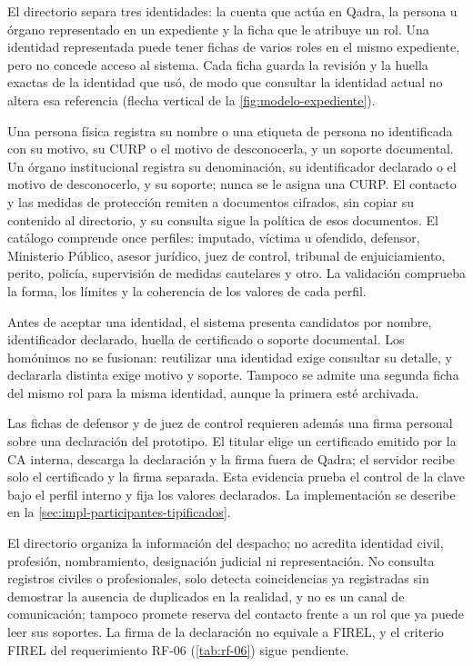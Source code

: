 El directorio separa tres identidades: la cuenta que actúa en Qadra, la persona u órgano representado en un expediente y la ficha que le atribuye un rol. Una identidad representada puede tener fichas de varios roles en el mismo expediente, pero no concede acceso al sistema. Cada ficha guarda la revisión y la huella exactas de la identidad que usó, de modo que consultar la identidad actual no altera esa referencia (flecha vertical de la \cref{fig:modelo-expediente}).

Una persona física registra su nombre o una etiqueta de persona no identificada con su motivo, su CURP o el motivo de desconocerla, y un soporte documental. Un órgano institucional registra su denominación, su identificador declarado o el motivo de desconocerlo, y su soporte; nunca se le asigna una CURP. El contacto y las medidas de protección remiten a documentos cifrados, sin copiar su contenido al directorio, y su consulta sigue la política de esos documentos. El catálogo comprende once perfiles: imputado, víctima u ofendido, defensor, Ministerio Público, asesor jurídico, juez de control, tribunal de enjuiciamiento, perito, policía, supervisión de medidas cautelares y otro. La validación comprueba la forma, los límites y la coherencia de los valores de cada perfil.

Antes de aceptar una identidad, el sistema presenta candidatos por nombre, identificador declarado, huella de certificado o soporte documental. Los homónimos no se fusionan: reutilizar una identidad exige consultar su detalle, y declararla distinta exige motivo y soporte. Tampoco se admite una segunda ficha del mismo rol para la misma identidad, aunque la primera esté archivada.

Las fichas de defensor y de juez de control requieren además una firma personal sobre una declaración del prototipo. El titular elige un certificado emitido por la CA interna, descarga la declaración y la firma fuera de Qadra; el servidor recibe solo el certificado y la firma separada. Esta evidencia prueba el control de la clave bajo el perfil interno y fija los valores declarados. La implementación se describe en la \cref{sec:impl-participantes-tipificados}.

El directorio organiza la información del despacho; no acredita identidad civil, profesión, nombramiento, designación judicial ni representación. No consulta registros civiles o profesionales, solo detecta coincidencias ya registradas sin demostrar la ausencia de duplicados en la realidad, y no es un canal de comunicación; tampoco promete reserva del contacto frente a un rol que ya puede leer sus soportes. La firma de la declaración no equivale a FIREL, y el criterio FIREL del requerimiento RF-06 (\cref{tab:rf-06}) sigue pendiente.

